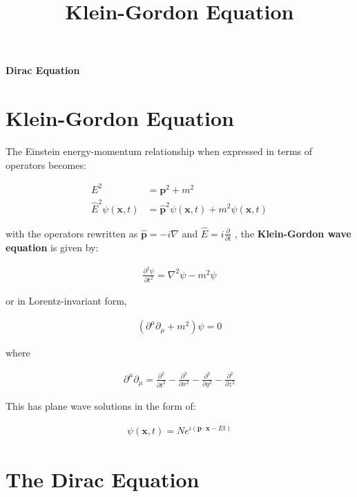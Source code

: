 \documentclass[10pt]{article}
\theoremstyle{definition}
\begin{document}
\setcounter{section}{1}
\title{Klein-Gordon Equation}

\pagestyle{fancy}
\fancyhf{}
\setlength{\headheight}{12.0pt}

\begin{center}
{\LARGE \bf Dirac Equation}\\
\end{center}

\section*{Klein-Gordon Equation}%

The Einstein energy-momentum relationship when expressed in terms of operators becomes:

\begin{align*}
    E^2 &= \mathbf{p}^2 + m^2\\
    \hat{E}^2\psi(\mathbf{x},t) &= \hat{\mathbf{p}}^2\psi(\mathbf{x},t) + m^2\psi(\mathbf{x},t)
\end{align*}

with the operators rewritten as $\hat{\mathbf{p}} = -i\nabla$ and $\hat{E} = i\frac{\partial}{\partial t}$ , the \textbf{Klein-Gordon wave equation} is given by:

\begin{align}
    \frac{\partial^2\psi}{\partial t^2} = \nabla^2\psi - m^2\psi
\end{align}

or in Lorentz-invariant form,

\begin{align}
    (\partial^{\mu}\partial_{\mu} + m^2)\psi = 0
\end{align}

where

\begin{align*}
    \partial^{\mu}\partial_{\mu} = \frac{\partial^2}{\partial t^2} - \frac{\partial^2}{\partial x^2} - \frac{\partial^2}{\partial y^2} - \frac{\partial^2}{\partial z^2}
\end{align*}

This has plane wave solutions in the form of:

\begin{align}
    \psi(\mathbf{x},t) = Ne^{i(\mathbf{p}\cdot\mathbf{x} - Et)}
\end{align}


\section*{The Dirac Equation}

\end{document}
